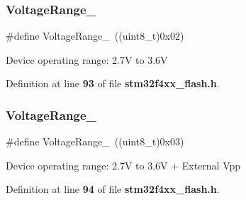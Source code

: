 \subsubsection{Voltage\+Range\+\_}
{\footnotesize\ttfamily \#define Voltage\+Range\+\_~((uint8\+\_\+t)0x02)}

Device operating range\+: 2.\+7V to 3.\+6V 

Definition at line \textbf{ 93} of file \textbf{ stm32f4xx\+\_\+flash.\+h}.

\mbox{\label{group__FLASH__Voltage__Range_ga3197950f6bfefc8b9a784db5439a0498}} 
\subsubsection{Voltage\+Range\+\_}
{\footnotesize\ttfamily \#define Voltage\+Range\+\_~((uint8\+\_\+t)0x03)}

Device operating range\+: 2.\+7V to 3.\+6V + External Vpp 

Definition at line \textbf{ 94} of file \textbf{ stm32f4xx\+\_\+flash.\+h}.

